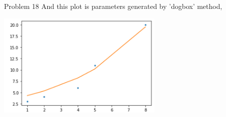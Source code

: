 \documentclass[10pt]{article}
\begin{document}
\begin{section}{Problem 18}
    And this plot is parameters generated by 'dogbox' method, 
	
	\includegraphics[width=8cm]{img/problem18_plt3.png}
\end{section}
\end{document}
